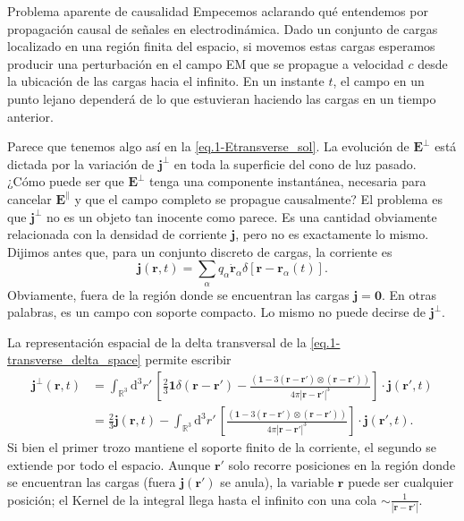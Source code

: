 \begin{observation}
    {Problema aparente de causalidad}
    \label{obs.1-transverse-not-causal}
    Empecemos aclarando qué entendemos por propagación causal de señales en electrodinámica. Dado un conjunto de cargas localizado en una región finita del espacio, si movemos estas cargas esperamos producir una perturbación en el campo EM que se propague a velocidad \(c\) desde la ubicación de las cargas hacia el infinito. En un instante \(t\), el campo en un punto lejano dependerá de lo que estuvieran haciendo las cargas en un tiempo anterior.

    Parece que tenemos algo así en la \cref{eq.1-Etransverse_sol}. La evolución de \(\mathbf{E}^\perp\) está dictada por la variación de \(\mathbf{j}^\perp\) en toda la superficie del cono de luz pasado. ¿Cómo puede ser que \(\mathbf{E}^\perp\) tenga una componente instantánea, necesaria para cancelar \(\mathbf{E}^\parallel\) y que el campo completo se propague causalmente? El problema es que \(\mathbf{j}^\perp\) no es un objeto tan inocente como parece. Es una cantidad obviamente relacionada con la densidad de corriente \(\mathbf{j}\), pero no es exactamente lo mismo. Dijimos antes que, para un conjunto discreto de cargas, la corriente es 
    \begin{equation*}
        \mathbf{j}(\mathbf{r}, t) = \sum_\alpha q_\alpha \dot{\mathbf{r}}_\alpha \delta[\mathbf{r}-\mathbf{r}_\alpha(t)].
    \end{equation*}
    Obviamente, fuera de la región donde se encuentran las cargas \(\mathbf{j}=\mathbf{0}\). En otras palabras, es un campo con soporte compacto. Lo mismo no puede decirse de \(\mathbf{j}^\perp\). 
    
    La representación espacial de la delta transversal de la \cref{eq.1-transverse_delta_space} permite escribir
    \begin{align}
        \nonumber
        \mathbf{j}^\perp(\mathbf{r}, t) &= \int_{\mathbb{R}^3}\mathrm{d}^3r'\, \left[\frac{2}{3}\mathbf{1}\delta(\mathbf{r}-\mathbf{r}') - \frac{(\mathbf{1} - 3(\mathbf{r}-\mathbf{r}')\otimes(\mathbf{r}-\mathbf{r}'))}{4\pi|\mathbf{r}-\mathbf{r}'|^3} \right]\cdot\mathbf{j}(\mathbf{r}', t) \\
        &= \frac{2}{3}\mathbf{j}(\mathbf{r}, t) - \int_{\mathbb{R}^3}\mathrm{d}^3r'\, \left[\frac{(\mathbf{1} - 3(\mathbf{r}-\mathbf{r}')\otimes(\mathbf{r}-\mathbf{r}'))}{4\pi|\mathbf{r}-\mathbf{r}'|^3} \right]\cdot\mathbf{j}(\mathbf{r}', t).
    \end{align}
    Si bien el primer trozo mantiene el soporte finito de la corriente, el segundo se extiende por todo el espacio. Aunque \(\mathbf{r}'\) solo recorre posiciones en la región donde se encuentran las cargas (fuera \(\mathbf{j}(\mathbf{r}')\) se anula), la variable \(\mathbf{r}\) puede ser cualquier posición; el Kernel de la integral llega hasta el infinito con una cola \(\sim \frac{1}{|\mathbf{r}-\mathbf{r}'|}\). 
    

\end{observation}
